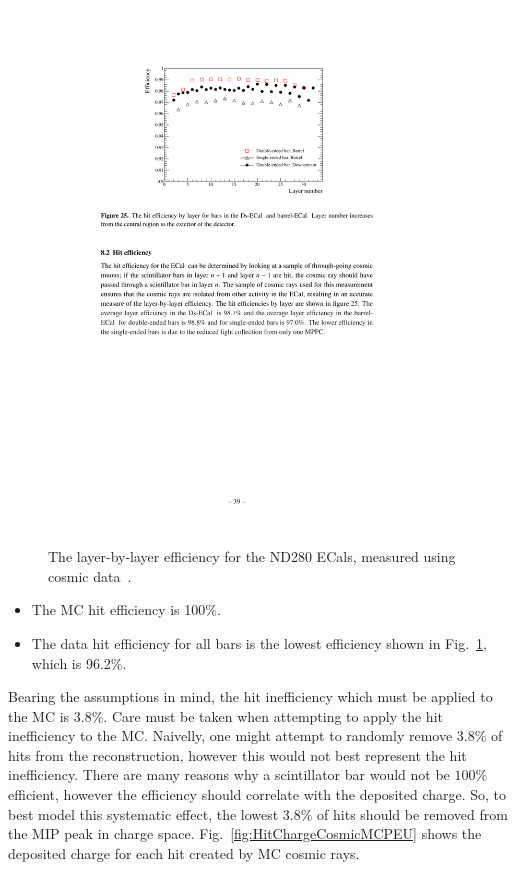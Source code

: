 \begin{figure}
  \centering
  \includegraphics[width=10cm]{images/measurement/systematics/detector/threshold/layer_efficiency_cosmics_data.pdf}
  \caption{The layer-by-layer efficiency for the ND280 ECals, measured using cosmic data~\cite{1748-0221-8-10-P10019}.}
  \label{fig:LayerEfficiencyCosmicData}
\end{figure}
\begin{itemize}
\item The MC hit efficiency is 100$\%$.
\item The data hit efficiency for all bars is the lowest efficiency shown in Fig.~\ref{fig:LayerEfficiencyCosmicData}, which is 96.2$\%$.
\end{itemize}
Bearing the assumptions in mind, the hit inefficiency which must be applied to the MC is 3.8$\%$.  Care must be taken when attempting to apply the hit inefficiency to the MC.  Naivelly, one might attempt to randomly remove 3.8$\%$ of hits from the reconstruction, however this would not best represent the hit inefficiency.  There are many reasons why a scintillator bar would not be $100\%$ efficient, however the efficiency should correlate with the deposited charge.  So, to best model this systematic effect, the lowest 3.8$\%$ of hits should be removed from the MIP peak in charge space.  Fig.~\ref{fig:HitChargeCosmicMCPEU} shows the deposited charge for each hit created by MC cosmic rays.
